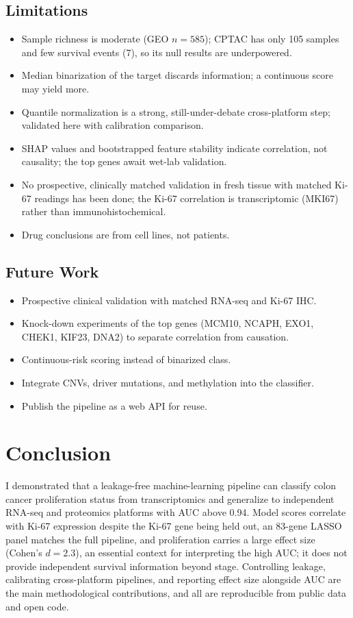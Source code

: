\documentclass[11pt]{article}
\begin{document}
\subsection{Limitations}
\begin{itemize}
    \item Sample richness is moderate (GEO $n = 585$); CPTAC has only 105 samples and few survival events (7), so its null results are underpowered.
    \item Median binarization of the target discards information; a continuous score may yield more.
    \item Quantile normalization is a strong, still-under-debate cross-platform step; validated here with calibration comparison.
    \item SHAP values and bootstrapped feature stability indicate correlation, not causality; the top genes await wet-lab validation.
    \item No prospective, clinically matched validation in fresh tissue with matched Ki-67 readings has been done; the Ki-67 correlation is transcriptomic (MKI67) rather than immunohistochemical.
    \item Drug conclusions are from cell lines, not patients.
\end{itemize}

\subsection{Future Work}
\begin{itemize}
\item Prospective clinical validation with matched RNA-seq and Ki-67 IHC.
\item Knock-down experiments of the top genes (MCM10, NCAPH, EXO1, CHEK1, KIF23, DNA2) to separate correlation from causation.
\item Continuous-risk scoring instead of binarized class.
\item Integrate CNVs, driver mutations, and methylation into the classifier.
\item Publish the pipeline as a web API for reuse.
\end{itemize}

\section{Conclusion}

I demonstrated that a leakage-free machine-learning pipeline can classify colon cancer proliferation status from transcriptomics and generalize to independent RNA-seq and proteomics platforms with AUC above 0.94. Model scores correlate with Ki-67 expression despite the Ki-67 gene being held out, an 83-gene LASSO panel matches the full pipeline, and proliferation carries a large effect size (Cohen's $d = 2.3$), an essential context for interpreting the high AUC; it does not provide independent survival information beyond stage. Controlling leakage, calibrating cross-platform pipelines, and reporting effect size alongside AUC are the main methodological contributions, and all are reproducible from public data and open code.
\end{document}
